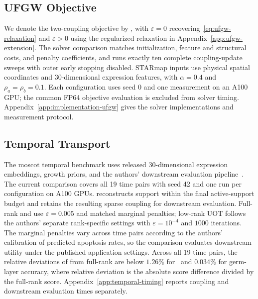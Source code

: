 \subsection{UFGW Objective}
We denote the two-coupling objective by \ufgwobj, with $\varepsilon=0$ recovering~\eqref{eq:ufgw-relaxation} and $\varepsilon>0$ using the regularized relaxation in Appendix~\ref{app:ufgw-extension}.
The solver comparison matches initialization, feature and structural costs, and penalty coefficients, and runs exactly ten complete coupling-update sweeps with outer early stopping disabled.
STARmap inputs use physical spatial coordinates and 30-dimensional expression features, with $\alpha=0.4$ and $\rho_a=\rho_b=0.1$.
Each configuration uses seed 0 and one measurement on an A100 GPU; the common FP64 objective evaluation is excluded from solver timing.
Appendix~\ref{app:implementation-ufgw} gives the solver implementations and measurement protocol.

\subsection{Temporal Transport}
The moscot temporal benchmark uses released 30-dimensional expression embeddings, growth priors, and the authors' downstream evaluation pipeline~\citep{klein2025mapping}.
The current comparison covers all 19 time pairs with seed 42 and one run per configuration on A100 GPUs.
\ourssparsink reconstructs support within the final active-support budget and retains the resulting sparse coupling for downstream evaluation.
Full-rank \sinkhorn and \ourssparsink use $\varepsilon=0.005$ and matched marginal penalties; low-rank UOT follows the authors' separate rank-specific settings with $\varepsilon=10^{-4}$ and $1000$ iterations.
The marginal penalties vary across time pairs according to the authors' calibration of predicted apoptosis rates, so the comparison evaluates downstream utility under the published application settings.
Across all 19 time pairs, the relative deviations of \ourssparsink from full-rank \sinkhorn are below $1.26\%$ for \transitionacc\ and $0.034\%$ for germ-layer accuracy, where relative deviation is the absolute score difference divided by the full-rank score.
Appendix~\ref{app:temporal-timing} reports coupling and downstream evaluation times separately.

